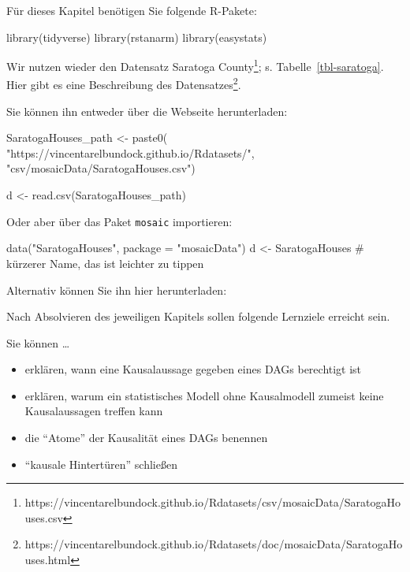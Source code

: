 \documentclass[
  ngerman,
  letterpaper,
  twoside,
  open=any]{scrbook}
\newenvironment{Shaded}{\begin{snugshade}}{\end{snugshade}}
\newcommand{\AttributeTok}[1]{\textcolor[rgb]{0.40,0.45,0.13}{#1}}
\newcommand{\CommentTok}[1]{\textcolor[rgb]{0.37,0.37,0.37}{#1}}
\newcommand{\FunctionTok}[1]{\textcolor[rgb]{0.28,0.35,0.67}{#1}}
\newcommand{\NormalTok}[1]{\textcolor[rgb]{0.00,0.23,0.31}{#1}}
\newcommand{\OtherTok}[1]{\textcolor[rgb]{0.00,0.23,0.31}{#1}}
\newcommand{\StringTok}[1]{\textcolor[rgb]{0.13,0.47,0.30}{#1}}
\providecommand{\tightlist}{%
  \setlength{\itemsep}{0pt}\setlength{\parskip}{0pt}}\usepackage{longtable,booktabs,array}
\theoremstyle{definition}
\theoremstyle{plain}
\theoremstyle{definition}
\theoremstyle{definition}
\theoremstyle{definition}
\theoremstyle{definition}
\theoremstyle{remark}
\begin{document}
\providecommand{\indep}{\perp \!\!\! \perp}

Für dieses Kapitel benötigen Sie folgende R-Pakete:

\begin{Shaded}
\begin{Highlighting}[]
\FunctionTok{library}\NormalTok{(tidyverse)}
\FunctionTok{library}\NormalTok{(rstanarm)}
\FunctionTok{library}\NormalTok{(easystats)}
\end{Highlighting}
\end{Shaded}

Wir nutzen wieder den Datensatz Saratoga County\footnote{https://vincentarelbundock.github.io/Rdatasets/csv/mosaicData/SaratogaHouses.csv};
s. Tabelle~\ref{tbl-saratoga}. Hier gibt es eine Beschreibung des
Datensatzes\footnote{https://vincentarelbundock.github.io/Rdatasets/doc/mosaicData/SaratogaHouses.html}.

Sie können ihn entweder über die Webseite herunterladen:

\begin{Shaded}
\begin{Highlighting}[]
\NormalTok{SaratogaHouses\_path }\OtherTok{\textless{}{-}} \FunctionTok{paste0}\NormalTok{(}
  \StringTok{"https://vincentarelbundock.github.io/Rdatasets/"}\NormalTok{,}
  \StringTok{"csv/mosaicData/SaratogaHouses.csv"}\NormalTok{)}

\NormalTok{d }\OtherTok{\textless{}{-}} \FunctionTok{read.csv}\NormalTok{(SaratogaHouses\_path)}
\end{Highlighting}
\end{Shaded}

Oder aber über das Paket \texttt{mosaic} importieren:

\begin{Shaded}
\begin{Highlighting}[]
\FunctionTok{data}\NormalTok{(}\StringTok{"SaratogaHouses"}\NormalTok{, }\AttributeTok{package =} \StringTok{"mosaicData"}\NormalTok{)}
\NormalTok{d }\OtherTok{\textless{}{-}}\NormalTok{ SaratogaHouses  }\CommentTok{\# kürzerer Name, das ist leichter zu tippen}
\end{Highlighting}
\end{Shaded}

Alternativ können Sie ihn hier herunterladen:

Nach Absolvieren des jeweiligen Kapitels sollen folgende Lernziele
erreicht sein.

Sie können \ldots{}

\begin{itemize}
\tightlist
\item
  erklären, wann eine Kausalaussage gegeben eines DAGs berechtigt ist
\item
  erklären, warum ein statistisches Modell ohne Kausalmodell zumeist
  keine Kausalaussagen treffen kann
\item
  die ``Atome'' der Kausalität eines DAGs benennen
\item
  ``kausale Hintertüren'' schließen
\end{itemize}
\end{document}
